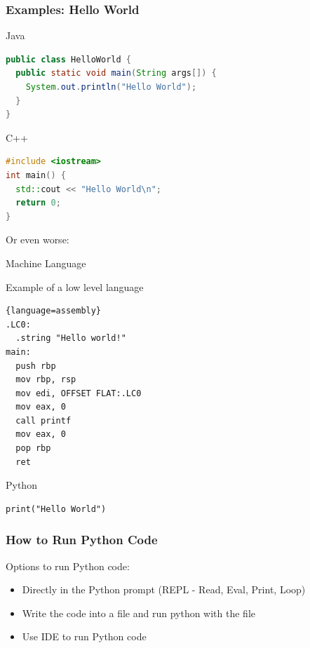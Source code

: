 \documentclass[10pt, a4paper]{beamer} %
\begin{document}
\begin{frame}\frametitle{Examples: Hello World}
  \begin{block}{Java}
  {
  \begin{lstlisting}[language=Java]
public class HelloWorld {
  public static void main(String args[]) {
    System.out.println("Hello World");
  }
}
  \end{lstlisting}  
  }
  \end{block}
  
  \begin{block}{C++}
  {
  \begin{lstlisting}[language=C++, morekeywords=include]
#include <iostream>
int main() {
  std::cout << "Hello World\n";
  return 0;
}
  \end{lstlisting}  
  }
  \end{block}
  \framebreak
Or even worse:
  \begin{block}{Machine Language}

  Example of a low level language
\begin{lstlisting}{language=assembly}
.LC0:
  .string "Hello world!"
main:
  push rbp
  mov rbp, rsp
  mov edi, OFFSET FLAT:.LC0
  mov eax, 0
  call printf
  mov eax, 0
  pop rbp
  ret
\end{lstlisting}

\end{block}

  \begin{block}{Python}
    \begin{lstlisting}
print("Hello World")
    \end{lstlisting}
  \end{block}
  
\end{frame}

\begin{frame}[fragile,c]\frametitle{How to Run Python Code}

\begin{block}{Options to run Python code:}
\begin{itemize}
  \item Directly in the Python prompt (REPL - Read, Eval, Print, Loop)
  \item Write the code into a file and run python with the file
  \item Use IDE to run Python code
\end{itemize}
\end{block}
  
\end{frame}
\end{document}

